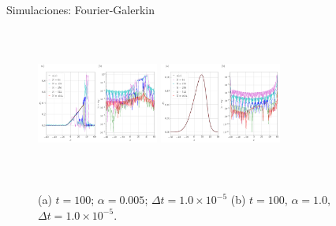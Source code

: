 \begin{frame}{Simulaciones: Fourier-Galerkin \hspace{2cm} \hyperlink{Navegador}{}}
    \begin{figure}
    	\centering
    	\includegraphics[height=5cm,width=4cm]{files/figures/viscid/galerkin/Numerical_Solution_alpha=0005_T=100.png}
        \qquad
    	\includegraphics[height=5cm,width=4cm]{files/figures/viscid/galerkin/Numerical_Solution_alpha=1_T=100.png}
        \caption{(a) $t = 100$; $\alpha = 0.005$; $\Delta t = 1.0 \times 10^{-5}$ (b) $t = 100$, $\alpha = 1.0$, $\Delta t = 1.0 \times 10^{-5}$.}
    \end{figure}
\end{frame}

